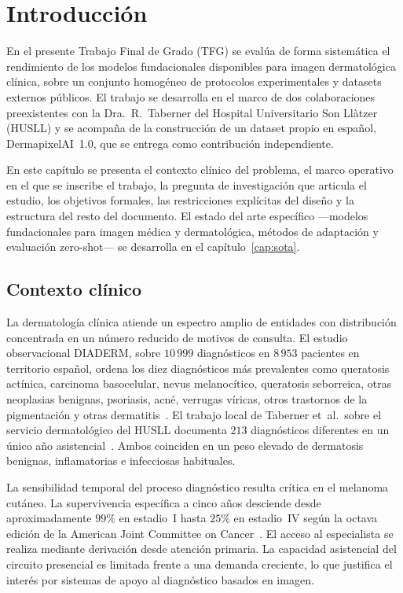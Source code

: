 
\chapter{Introducción}
\label{cap:intro}

En el presente Trabajo Final de Grado (TFG) se evalúa de forma
sistemática el rendimiento de los modelos fundacionales disponibles
para imagen dermatológica clínica, sobre un conjunto homogéneo de
protocolos experimentales y datasets externos públicos. El trabajo
se desarrolla en el marco de dos colaboraciones preexistentes con
la Dra.~R.~Taberner del Hospital Universitario Son Llàtzer (HUSLL)
y se acompaña de la construcción de un dataset propio en español,
DermapixelAI~1.0, que se entrega como contribución independiente.

En este capítulo se presenta el contexto clínico del problema, el
marco operativo en el que se inscribe el trabajo, la pregunta de
investigación que articula el estudio, los objetivos formales, las
restricciones explícitas del diseño y la estructura del resto del
documento. El estado del arte específico ---modelos fundacionales
para imagen médica y dermatológica, métodos de adaptación y
evaluación zero-shot--- se desarrolla en el
capítulo~\ref{cap:sota}.


\section{Contexto clínico}
\label{sec:contexto}

La dermatología clínica atiende un espectro amplio de entidades con
distribución concentrada en un número reducido de motivos de
consulta. El estudio observacional DIADERM, sobre $10\,999$
diagnósticos en $8\,953$ pacientes en territorio español,
ordena los diez diagnósticos más prevalentes como queratosis
actínica, carcinoma basocelular, nevus melanocítico, queratosis
seborreica, otras neoplasias benignas, psoriasis, acné, verrugas
víricas, otros trastornos de la pigmentación y otras
dermatitis~\cite{diaderm2018}. El trabajo local de Taberner et~al.\
sobre el servicio dermatológico del HUSLL documenta $213$
diagnósticos diferentes en un único año
asistencial~\cite{taberner2010_motivos}. Ambos coinciden en un peso
elevado de dermatosis benignas, inflamatorias e infecciosas
habituales.

La sensibilidad temporal del proceso diagnóstico resulta crítica en
el melanoma cutáneo. La supervivencia específica a cinco años
desciende desde aproximadamente $99\%$ en estadio~I hasta
$25\%$ en estadio~IV según la octava edición de la American
Joint Committee on Cancer~\cite{ajcc8}. El acceso al especialista
se realiza mediante derivación desde atención primaria. La
capacidad asistencial del circuito presencial es limitada frente a
una demanda creciente, lo que justifica el interés por sistemas de
apoyo al diagnóstico basados en imagen.

